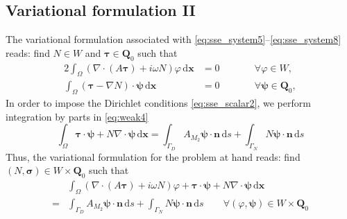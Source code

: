 \documentclass[11pt,a4paper]{article}
\begin{document}
\subsection{Variational formulation II}
The variational formulation associated with \eqref{eq:sse_system5}--\eqref{eq:sse_system8} reads: find $N\in W$ and $\boldsymbol{\tau}\in\mathbf{Q}_0$ such that 
\begin{alignat}{2}
\int_\Omega\left(\nabla\cdot(A\boldsymbol{\tau})+i\omega N\right)\varphi\,\mathrm{d}\mathbf{x}&=0 \qquad && \forall \varphi\in W,
\label{eq:weak3}\\
\int_\Omega\left(\boldsymbol{\tau}-\nabla N\right)\cdot\boldsymbol{\psi}\,\mathrm{d}\mathbf{x}&=0 \qquad && \forall \boldsymbol{\psi}\in \mathbf{Q}_0,
\label{eq:weak4}
\end{alignat}
In order to impose the Dirichlet conditions \eqref{eq:sse_scalar2}, we perform integration by parts in \eqref{eq:weak4} 
\begin{equation}
\int_\Omega\boldsymbol{\tau}\cdot\boldsymbol{\psi}+
N\nabla\cdot\boldsymbol{\psi}\,\mathrm{d}\mathbf{x}=
\int_{\Gamma_D}A_{M_2}\boldsymbol{\psi}\cdot\mathbf{n}\,\mathrm{d}s+
\int_{\Gamma_N}N\boldsymbol{\psi}\cdot\mathbf{n}\,\mathrm{d}s
\end{equation}
Thus, the variational formulation for the problem at hand reads: find $(N,\boldsymbol{\sigma})\in W\times\mathbf{Q}_0$ such that
\begin{align}
&\int_\Omega\left(\nabla\cdot(A\boldsymbol{\tau})+i\omega N\right)\varphi+\boldsymbol{\tau}\cdot\boldsymbol{\psi}+N\nabla\cdot\boldsymbol{\psi}\,\mathrm{d}\mathbf{x}\\
=& \int_{\Gamma_D}A_{M_2}\boldsymbol{\psi}\cdot\mathbf{n}\,\mathrm{d}s+
\int_{\Gamma_N}N\boldsymbol{\psi}\cdot\mathbf{n}\,\mathrm{d}s
\qquad \forall (\varphi,\boldsymbol{\psi})\in W\times\mathbf{Q}_0
\end{align}
\end{document}

